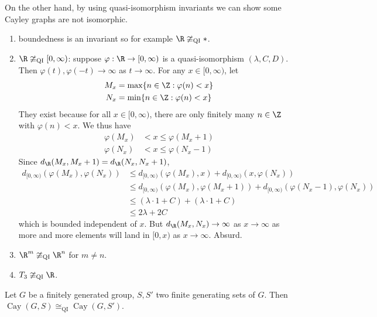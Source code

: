 \documentclass[a4paper]{article}
\DeclareMathOperator{\Cay}{Cay} %
\begin{document}
\begin{eg}
  On the other hand, by using quasi-isomorphism invariants we can show some Cayley graphs are not isomorphic.
  \begin{enumerate}
  \item boundedness is an invariant so for example \(\R \ncong_{\mathrm{QI}} *\).
  \item \(\R \ncong_{\mathrm{QI}} [0, \infty)\): suppose \(\varphi: \R \to [0, \infty)\) is a quasi-isomorphism \((\lambda, C, D)\). Then \(\varphi(t), \varphi(-t) \to \infty\) as \(t \to \infty\). For any \(x \in [0, \infty)\), let
    \begin{align*}
      M_x &= \max \{n \in \Z: \varphi(n) < x\} \\
      N_x &= \min \{n \in \Z: \varphi(n) < x\} 
    \end{align*}
    They exist because for all \(x \in [0, \infty)\), there are only finitely many \(n \in \Z\) with \(\varphi(n) < x\). We thus have
    \begin{align*}
      \varphi(M_x) &< x \leq \varphi(M_x + 1) \\
      \varphi(N_x) &< x \leq \varphi(N_x - 1)
    \end{align*}
    Since \(d_\R(M_x, M_x + 1) = d_\R(N_x, N_x + 1)\),
    \begin{align*}
      d_{[0, \infty)}(\varphi(M_x), \varphi(N_x))
      &\leq d_{[0, \infty)}(\varphi(M_x), x) + d_{[0, \infty)}(x, \varphi(N_x)) \\
      &\leq d_{[0, \infty)}(\varphi(M_x), \varphi(M_x + 1)) + d_{[0, \infty)}(\varphi(N_x - 1), \varphi(N_x)) \\
      &\leq (\lambda \cdot 1 + C) + (\lambda \cdot 1 + C) \\
      &\leq 2 \lambda + 2C
    \end{align*}
    which is bounded independent of \(x\). But \(d_\R(M_x, N_x) \to \infty\) as \(x \to \infty\) as more and more elements will land in \([0, x)\) as \(x \to \infty\). Absurd.
  \item \(\R^m \ncong_{\mathrm{QI}} \R^n\) for \(m \ne n\).
  \item \(T_3 \ncong_{\mathrm{QI}} \R\).
  \end{enumerate}
\end{eg}

\begin{proposition}
  Let \(G\) be a finitely generated group, \(S, S'\) two finite generating sets of \(G\). Then \(\Cay(G, S) \cong_{\mathrm{QI}} \Cay(G, S')\).
\end{proposition}
\end{document}
